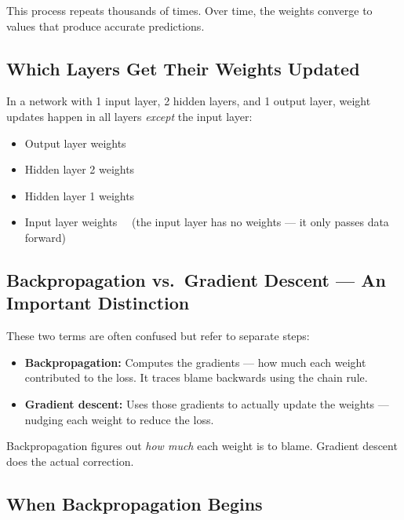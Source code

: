 \documentclass[12pt,a4paper]{article}
\begin{document}
This process repeats thousands of times. Over time, the weights converge to values that
produce accurate predictions.

\subsection{Which Layers Get Their Weights Updated}

In a network with 1 input layer, 2 hidden layers, and 1 output layer, weight updates
happen in all layers \textit{except} the input layer:

\begin{itemize}
    \item Output layer weights \checkmark
    \item Hidden layer 2 weights \checkmark
    \item Hidden layer 1 weights \checkmark
    \item Input layer weights \texttimes\ \ (the input layer has no weights --- it only
          passes data forward)
\end{itemize}

\subsection{Backpropagation vs.\ Gradient Descent --- An Important Distinction}

These two terms are often confused but refer to separate steps:

\begin{itemize}
    \item \textbf{Backpropagation:} Computes the gradients --- how much each weight
          contributed to the loss. It traces blame backwards using the chain rule.
    \item \textbf{Gradient descent:} Uses those gradients to actually update the weights
          --- nudging each weight to reduce the loss.
\end{itemize}

Backpropagation figures out \textit{how much} each weight is to blame. Gradient descent
does the actual correction.

\subsection{When Backpropagation Begins}
\end{document}
